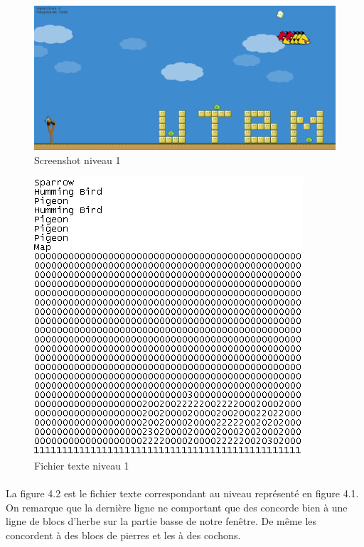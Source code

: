\documentclass[a4paper,12pt]{report}
\begin{document}
\begin{figure}[H]
\begin{center}
\includegraphics[scale=0.4]{images/lvl01image.png} 
\end{center}
\caption{Screenshot niveau 1}
\label{Screenshot niveau 1}
\end{figure}

\begin{figure}[H]
\begin{center}
\includegraphics[scale=1]{images/lvl01texte.png} 
\end{center}
\caption{Fichier texte niveau 1}
\label{Fichier texte niveau 1}
\end{figure}

\paragraph{}La figure 4.2 est le fichier texte correspondant au niveau représenté en figure 4.1. On remarque que la dernière ligne ne comportant que des  \guillemotright concorde bien à une ligne de blocs d'herbe sur la partie basse de notre fenêtre. De même les  \guillemotright concordent à des blocs de pierres et les  \guillemotright à des cochons.
\end{document}
